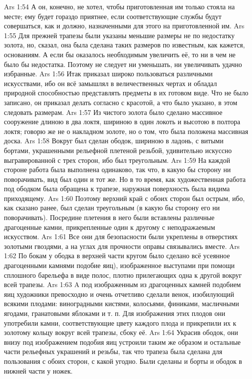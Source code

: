 \vs Ars 1:54
А он, конечно, не хотел, чтобы приготовленная им только стояла на месте; ему будет гораздо приятнее, если соответствующие службы будут совершаться, как и должно, назначенными для этого на приготовленной им.
\vs Ars 1:55
Для прежней трапезы были указаны меньшие размеры не по недостатку золота, но, сказал, она была сделана таких размеров по известным, как кажется, основаниям. А если бы оказалось необходимым увеличить её, то ни в чем не было бы недостатка. Поэтому не следует ни уменьшать, ни увеличивать удачно избранные.
\vs Ars 1:56
Итак приказал широко пользоваться различными искусствами, ибо он всё замышлял в величественных чертах и обладал природной способностью представлять предметы в их готовом виде. Что не было записано, он приказал делать согласно с красотой, а что было указано, в этом следовать размерам.
\vs Ars 1:57
Из чистого золота было сделано массивное сооружение длиною в два локтя, шириною в один локоть и высотою в полтора локтя; говорю же не о накладном золоте, но о том, что была положена массивная доска.
\vs Ars 1:58
Вокруг был сделан ободок, шириною в ладонь, с витыми бортами, украшенными рельефной плетеной резьбой, удивительно искуссно выгравированной с трех сторон, ибо был треугольным.
\vs Ars 1:59
На каждой стороне работа была выполнена одинаково, так что, в какую бы сторону ни поворачивать, вид был один и тот же. Но в то время, как художественная работа под ободком была обращена к трапезе, наружная поверхность была видима приходящему.
\vs Ars 1:60
Поэтому верхний край с обоих сторон был острым, ибо, как сказано ранее, был сделан треугольным (в какую бы сторону его ни поворачивать). Посредине плетения в него были вставлены различные драгоценные камни, прикрепленные один к другому с неподражаемым искусством.
\vs Ars 1:61
Все они для безопасности были укреплены в отверстиях золотыми гвоздями, а на углах для прочности оправы связывались вместе.
\vs Ars 1:62
По бокам у ободка в верхней части кругом было сделано всё усеянное драгоценными камнями подобие яиц), изображенное выступами при помощи сплошного барельефа в виде полос, плотно прилегающих одна к другой вокруг всей трапезы.
\vs Ars 1:63
A под изображенным из драгоценных камней подобием яиц художники превосходно и очень отчетливо сделали венок, изобилующий всякими плодами: виноградными кистями, колосьями, финиками, масличными ягодами, гранатовыми яблоками и т. п. Для изображения этих плодов они употребили камни, соответствующие цвету каждого плода и прикрепили их к золотому кольцу вокруг всей трапезы, сбоку её.
\vs Ars 1:64
Украсив ободок, они внизу под изображением подобия яиц устроили таким же образом и остальные части рельефных украшений и резьбы, так что трапеза была сделана для пользования с обоих сторон, с какой угодно. Были сделаны и борты и ободок в нижней части у ножек.
